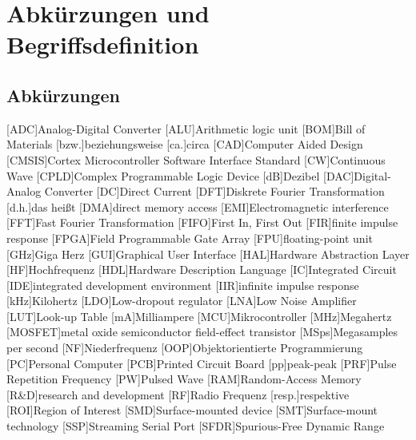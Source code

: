 \chapter{Abkürzungen und Begriffsdefinition}

\section{Abkürzungen} 
\begin{acronym}[SEPSEP]\itemsep0pt
[ADC]{Analog-Digital Converter}
[ALU]{Arithmetic logic unit}
[BOM]{Bill of Materials}
[bzw.]{beziehungsweise}
[ca.]{circa}
[CAD]{Computer Aided Design}
[CMSIS]{Cortex Microcontroller Software Interface Standard}
[CW]{Continuous Wave}
[CPLD]{Complex Programmable Logic Device}
[dB]{Dezibel}
[DAC]{Digital-Analog Converter}
[DC]{Direct Current}
[DFT]{Diskrete Fourier Transformation}
[d.h.]{das heißt}
[DMA]{direct memory access}
[EMI]{Electromagnetic interference}
[FFT]{Fast Fourier Transformation}
[FIFO]{First In, First Out}
[FIR]{finite impulse response}
[FPGA]{Field Programmable Gate Array}
[FPU]{floating-point unit}
[GHz]{Giga Herz}
[GUI]{Graphical User Interface}
[HAL]{Hardware Abstraction Layer}
[HF]{Hochfrequenz}
[HDL]{Hardware Description Language}
[IC]{Integrated Circuit}
[IDE]{integrated development environment}
[IIR]{infinite impulse response}
[kHz]{Kilohertz}
[LDO]{Low-dropout regulator}
[LNA]{Low Noise Amplifier}
[LUT]{Look-up Table}
[mA]{Milliampere}
[MCU]{Mikrocontroller}
[MHz]{Megahertz}
[MOSFET]{metal oxide semiconductor field-effect transistor}
[MSps]{Megasamples per second}
[NF]{Niederfrequenz}
[OOP]{Objektorientierte Programmierung}
[PC]{Personal Computer}
[PCB]{Printed Circuit Board}
[pp]{peak-peak}
[PRF]{Pulse Repetition Frequency}
[PW]{Pulsed Wave}
[RAM]{Random-Access Memory}
[R\&D]{research and development}
[RF]{Radio Frequenz}
[resp.]{respektive}
[ROI]{Region of Interest}
[SMD]{Surface-mounted device}
[SMT]{Surface-mount technology}
[SSP]{Streaming Serial Port}
[SFDR]{Spurious-Free Dynamic Range}


\end{acronym}
